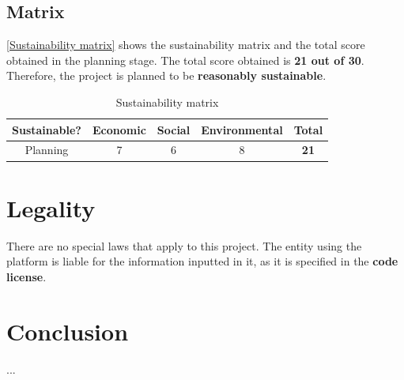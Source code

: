 \documentclass[a4paper,11pt,titlepage,abstract,numbers=noenddot,automark,mnsy,intlimits,rgb,dvipsnames]{report}
\begin{document}
\section{Matrix}
\autoref{Sustainability matrix} shows the sustainability matrix and the total score obtained in the planning
stage. The total score obtained is \textbf{21 out of 30}. Therefore, the project is planned to be \textbf{reasonably sustainable}.
\begin{table}[H]
\centering
\begin{tabular}{c | c | c | c | c}
\textbf{Sustainable?} & \textbf{Economic} & \textbf{Social} & \textbf{Environmental} & \textbf{Total}\\
\hline
Planning & 7 & 6 & 8 & \textbf{21}\\
\end{tabular}
\caption{Sustainability matrix}
\label{Sustainability matrix}
\end{table}
\chapter{Legality}
There are no special laws that apply to this project. The entity using the platform
is liable for the information inputted in it, as it is specified in the \textbf{code license}.
\chapter{Conclusion}
...


\end{document}
